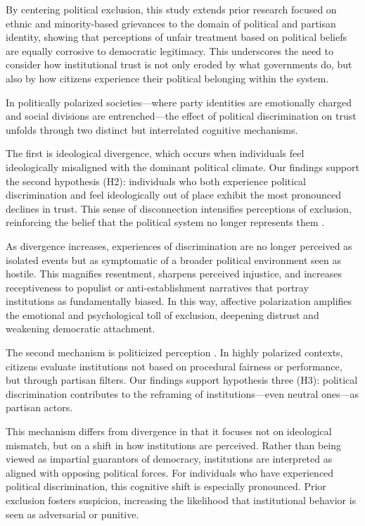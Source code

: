 \documentclass{article}
\begin{document}
By centering political exclusion, this study extends prior research focused on ethnic and minority-based grievances \parencite{wilkes_immigration_2019, tyrberg_impact_2024} to the domain of political and partisan identity, showing that  perceptions of unfair treatment based on political beliefs are equally corrosive to democratic legitimacy. This underscores the need to consider how institutional trust is not only eroded by what governments do, but also by how citizens experience their political belonging within the system.

In politically polarized societies—where party identities are emotionally charged and social divisions are entrenched—the effect of political discrimination on trust unfolds through two distinct but interrelated cognitive mechanisms.

The first is ideological divergence, which occurs when individuals feel ideologically misaligned with the dominant political climate. Our findings support the second hypothesis (H2): individuals who both experience political discrimination and feel ideologically out of place exhibit the most pronounced declines in trust. This sense of disconnection intensifies perceptions of exclusion, reinforcing the belief that the political system no longer represents them \parencite{mccoy_polarization_2018, iyengar_fear_2015}.

As divergence increases, experiences of discrimination are no longer perceived as isolated events but as symptomatic of a broader political environment seen as hostile. This magnifies resentment, sharpens perceived injustice, and increases receptiveness to populist or anti-establishment narratives that portray institutions as fundamentally biased. In this way, affective polarization amplifies the emotional and psychological toll of exclusion, deepening distrust and weakening democratic attachment.

The second mechanism is politicized perception \parencite{rogowski_how_2016, druckman_what_2019}. In highly polarized contexts, citizens evaluate institutions not based on procedural fairness or performance, but through partisan filters. Our findings support hypothesis three (H3): political discrimination contributes to the reframing of institutions—even neutral ones—as partisan actors.

This mechanism differs from divergence in that it focuses not on ideological mismatch, but on a shift in how institutions are perceived. Rather than being viewed as impartial guarantors of democracy, institutions are interpreted as aligned with opposing political forces. For individuals who have experienced political discrimination, this cognitive shift is especially pronounced. Prior exclusion fosters suspicion, increasing the likelihood that institutional behavior is seen as adversarial or punitive.
\end{document}
